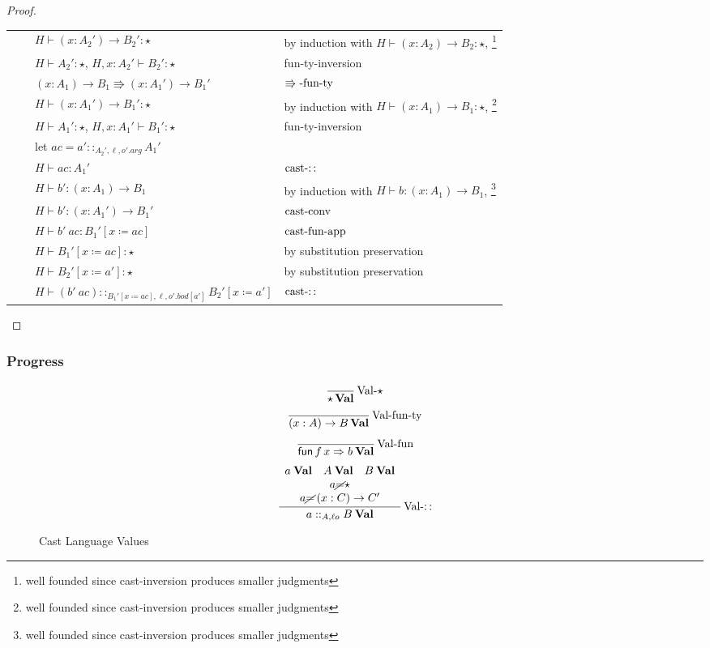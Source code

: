 \begin{proof}
\begin{tabular}{llll}
 &  & $H\vdash\left(x:A_{2}'\right)\rightarrow B_{2}':\star$ & by induction with $H\vdash\left(x:A_{2}\right)\rightarrow B_{2}:\star$,
\footnote{well founded since cast-inversion produces smaller judgments}\tabularnewline
 &  & $H\vdash A_{2}':\star$, $H,x:A_{2}'\vdash B_{2}':\star$ & fun-ty-inversion\tabularnewline
 &  & $\left(x:A_{1}\right)\rightarrow B_{1}\Rrightarrow\left(x:A_{1}'\right)\rightarrow B_{1}'$ & $\operatorname{\Rrightarrow-fun-ty}$\tabularnewline
 &  & $H\vdash\left(x:A_{1}'\right)\rightarrow B_{1}':\star$ & by induction with $H\vdash\left(x:A_{1}\right)\rightarrow B_{1}:\star$,
\footnote{well founded since cast-inversion produces smaller judgments}\tabularnewline
 &  & $H\vdash A_{1}':\star$, $H,x:A_{1}'\vdash B_{1}':\star$ & fun-ty-inversion\tabularnewline
 &  & let $ac=a'::_{A_{2}',\ell,o'.arg}A_{1}'$ & \tabularnewline
 &  & $H\vdash ac:A_{1}'$ & $\operatorname{cast-::}$\tabularnewline
 &  & $H\vdash b':\left(x:A_{1}\right)\rightarrow B_{1}$ & by induction with $H\vdash b:\left(x:A_{1}\right)\rightarrow B_{1}$,
\footnote{well founded since cast-inversion produces smaller judgments}\tabularnewline
 &  & $H\vdash b':\left(x:A_{1}'\right)\rightarrow B_{1}'$ & $\operatorname{cast-conv}$\tabularnewline
 &  & $H\vdash b'\ ac:B_{1}'\left[x\coloneqq ac\right]$ & $\operatorname{cast-fun-app}$\tabularnewline
 &  & $H\vdash B_{1}'\left[x\coloneqq ac\right]:\star$ & by substitution preservation\tabularnewline
 &  & $H\vdash B_{2}'\left[x\coloneqq a'\right]:\star$ & by substitution preservation\tabularnewline
 &  & $H\vdash\left(b'\ ac\right)::_{B_{1}'\left[x\coloneqq ac\right],\ell ,o'.bod[a']}B_{2}'\left[x\coloneqq a'\right]$ & $\operatorname{cast-::}$\tabularnewline
\end{tabular}
\end{proof}


\subsubsection{Progress}

\begin{figure}
\[
\frac{\,}{\star\,\textbf{Val}}\operatorname{Val-\star}
\]
\[
\frac{\,}{\left(x:A\right)\rightarrow B\,\textbf{Val}}\operatorname{Val-fun-ty}
\]
\[
\frac{\,}{\mathsf{fun}\,f\,x\Rightarrow b\:\textbf{Val}}\operatorname{Val-fun}
\]
\[
\frac{\begin{array}{c}
a\:\textbf{Val}\quad A\:\textbf{Val}\quad B\:\textbf{Val}\\
a\cancel{=}\star\\
a\cancel{=}\left(x:C\right)\rightarrow C'
\end{array}}{a::_{A,\ell o}B\:\textbf{Val}}\operatorname{Val-::}
\]
\caption{Cast Language Values}
\label{fig:cast-val}
\end{figure}

